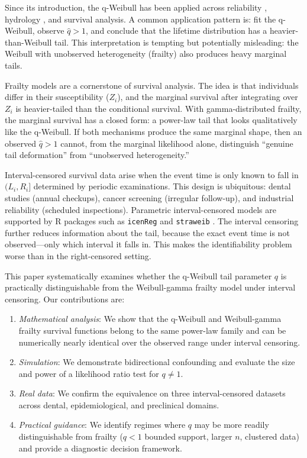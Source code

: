 \documentclass[12pt,a4paper]{article}
\begin{document}
Since its introduction, the q-Weibull has been applied across reliability \citep{dos2006q, neretti2014q}, hydrology \citep{nan2018q}, and survival analysis. A common application pattern is: fit the q-Weibull, observe $\hat q>1$, and conclude that the lifetime distribution has a heavier-than-Weibull tail. This interpretation is tempting but potentially misleading: the Weibull with unobserved heterogeneity (frailty) also produces heavy marginal tails.

Frailty models \citep{vaupel1979frailty} are a cornerstone of survival analysis. The idea is that individuals differ in their susceptibility ($Z_i$), and the marginal survival after integrating over $Z_i$ is heavier-tailed than the conditional survival. With gamma-distributed frailty, the marginal survival has a closed form: a power-law tail that looks qualitatively like the q-Weibull. If both mechanisms produce the same marginal shape, then an observed $\hat q>1$ cannot, from the marginal likelihood alone, distinguish ``genuine tail deformation'' from ``unobserved heterogeneity.''

Interval-censored survival data arise when the event time is only known to fall in $(L_i, R_i]$ determined by periodic examinations. This design is ubiquitous: dental studies (annual checkups), cancer screening (irregular follow-up), and industrial reliability (scheduled inspections). Parametric interval-censored models are supported by R packages such as \texttt{icenReg} \citep{icenReg} and \texttt{straweib} \citep{straweib}. The interval censoring further reduces information about the tail, because the exact event time is not observed---only which interval it falls in. This makes the identifiability problem worse than in the right-censored setting.

This paper systematically examines whether the q-Weibull tail parameter $q$ is practically distinguishable from the Weibull-gamma frailty model under interval censoring. Our contributions are:
\begin{enumerate}
\item \emph{Mathematical analysis}: We show that the q-Weibull and Weibull-gamma frailty survival functions belong to the same power-law family and can be numerically nearly identical over the observed range under interval censoring.
\item \emph{Simulation}: We demonstrate bidirectional confounding and evaluate the size and power of a likelihood ratio test for $q\neq1$.
\item \emph{Real data}: We confirm the equivalence on three interval-censored datasets across dental, epidemiological, and preclinical domains.
\item \emph{Practical guidance}: We identify regimes where $q$ may be more readily distinguishable from frailty ($q<1$ bounded support, larger $n$, clustered data) and provide a diagnostic decision framework.
\end{enumerate}
\end{document}

